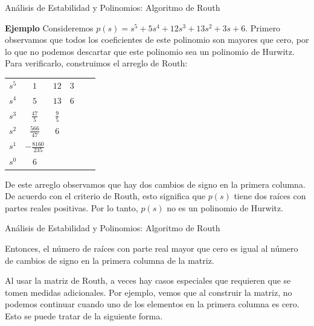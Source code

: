 \documentclass{beamer}
\begin{document}
\begin{frame}{Análisis de Estabilidad y Polinomios: Algoritmo de Routh}
\begin{justify}
\textbf{Ejemplo} Consideremos \( p(s) = s^5 + 5s^4 + 12s^3 + 13s^2 + 3s + 6 \). Primero observamos que todos los coeficientes de este polinomio son mayores que cero, por lo que no podemos descartar que este polinomio sea un polinomio de Hurwitz. Para verificarlo, construimos el arreglo de Routh:

{\footnotesize
\begin{center}
\begin{tabular}{c|ccccc}
$s^5$ & $1$ & $12$ & $3$ &  &  \\ 
$s^4$ & $5$ & $13$ & $6$ &  &  \\
$s^3$ & $\frac{47}{5}$ & $\frac{9}{5}$ &  &  &  \\
$s^2$ & $\frac{566}{47}$ & $6$ &  &  &  \\
$s^1$ & $-\frac{8160}{235}$ &  &  &  &  \\
$s^0$ & $6$ &  &  &  &  \\
\end{tabular}
\label{matriz Routh}
\end{center}
}

De este arreglo observamos que hay dos cambios de signo en la primera columna. De acuerdo con el criterio de Routh, esto significa que \( p(s) \) tiene dos raíces con partes reales positivas. Por lo tanto, \( p(s) \) no es un polinomio de Hurwitz.

\end{justify}
\end{frame}

\begin{frame}{Análisis de Estabilidad y Polinomios: Algoritmo de Routh}
\begin{justify}

  Entonces, el número de raíces con parte real mayor que cero es igual al número de cambios de signo en la primera columna de la matriz.

 \vspace{0.3cm}
 Al usar la matriz de Routh, a veces hay casos especiales que requieren que se tomen medidas adicionales. Por ejemplo, vemos que al construir la matriz, no podemos continuar cuando uno de los elementos en la primera columna es cero. Esto se puede tratar de la siguiente forma.


\end{justify}
\end{frame}
\end{document}
